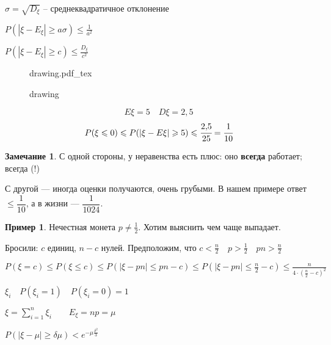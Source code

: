 \documentclass{book}
\theoremstyle{definition}
\newtheorem*{note}{Замечание}
\newtheorem*{example}{Пример}
\newcommand{\incfig}[1]{%
    \def\svgwidth{\columnwidth}
    {#1.pdf_tex}
}
\begin{document}
$\sigma = \sqrt{D_{\xi}} $ -- среднеквадратичное отклонение
\begin{theorem}
$P\left( |\xi-E_{\xi}|\geqslant a\sigma \right) \leqslant \frac{1}{a^2}$
\end{theorem}

$P\left( |\xi-E_{\xi}|\geqslant c \right) \leqslant \frac{D_{\xi}}{c^2}$

\begin{figure}[ht]
    \centering
    \incfig{drawing}
    \caption{drawing}
    \label{fig:drawing}
\end{figure}

\begin{problem}
    \[E\xi = 5 \quad D\xi = 2{,}5\]
    \[P(\xi \leqslant 0) \leqslant P(|\xi - E\xi| \geqslant 5) \leqslant \cfrac{2{,}5}{25} = \cfrac{1}{10}\]
\end{problem}

\begin{note}
    С одной стороны, у неравенства есть плюс: \quad оно \textbf{всегда} работает; всегда (!)
    
    С другой --- иногда оценки получаются, очень грубыми. В нашем примере ответ $\leqslant \dfrac{1}{10}$, а в жизни --- $\dfrac{1}{1024}$.
\end{note}


\begin{example}
    Нечестная монета $p\neq \frac{1}{2}$. Хотим выяснить чем чаще выпадает.

    Бросили: $c$ единиц,  $n-c$ нулей. Предположим, что  $c<\frac{n}{2}\quad p>\frac{1}{2}\quad pn>\frac{n}{2}$ 

    $P\left( \xi = c \right) \leqslant P\left( \xi\leqslant c \right) \leqslant P\left( |\xi-pn|\leqslant pn-c \right) \leqslant P\left(| \xi-pn|\leqslant \frac{n}{2}-c \right) \leqslant \frac{n}{4\cdot \left( \frac{n}{2}-c \right) ^2}$
\end{example}

\begin{theorem}

    $\xi_i\quad P\left( \xi_i = 1 \right) \quad P\left( \xi_i = 0 \right) =1$

    $\xi = \sum_{i=1}^{n} \xi_i\qquad E_{\xi} = np = \mu$

    $P\left( |\xi - \mu| \geqslant \delta \mu \right) < e^{-\mu \frac{\delta^2}{3}} $
\end{theorem}
\end{document}
